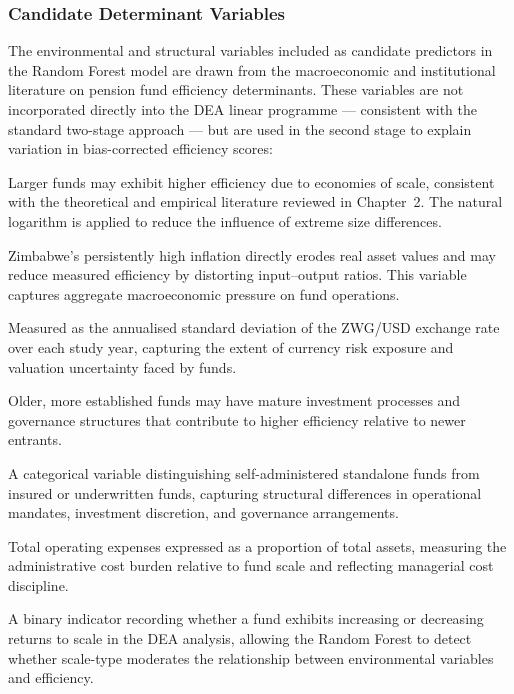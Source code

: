 \documentclass[12pt,a4paper]{article}
\begin{document}
\subsubsection{Candidate Determinant Variables}

The environmental and structural variables included as candidate predictors in the Random Forest model are drawn from the macroeconomic and institutional literature on pension fund efficiency determinants. These variables are not incorporated directly into the DEA linear programme --- consistent with the standard two-stage approach --- but are used in the second stage to explain variation in bias-corrected efficiency scores:

\begin{description}[noitemsep]
    \item[Fund Size (log Total Assets):] Larger funds may exhibit higher efficiency due to economies of scale, consistent with the theoretical and empirical literature reviewed in Chapter~2. The natural logarithm is applied to reduce the influence of extreme size differences.
    \item[Annual Inflation Rate (CPI Growth):] Zimbabwe's persistently high inflation directly erodes real asset values and may reduce measured efficiency by distorting input--output ratios. This variable captures aggregate macroeconomic pressure on fund operations.
    \item[Exchange Rate Volatility:] Measured as the annualised standard deviation of the ZWG/USD exchange rate over each study year, capturing the extent of currency risk exposure and valuation uncertainty faced by funds.
    \item[Fund Age:] Older, more established funds may have mature investment processes and governance structures that contribute to higher efficiency relative to newer entrants.
    \item[Fund Type (Binary Indicator):] A categorical variable distinguishing self-administered standalone funds from insured or underwritten funds, capturing structural differences in operational mandates, investment discretion, and governance arrangements.
    \item[Expense Ratio:] Total operating expenses expressed as a proportion of total assets, measuring the administrative cost burden relative to fund scale and reflecting managerial cost discipline.
    \item[Returns-to-Scale Classification:] A binary indicator recording whether a fund exhibits increasing or decreasing returns to scale in the DEA analysis, allowing the Random Forest to detect whether scale-type moderates the relationship between environmental variables and efficiency.
\end{description}
\end{document}
